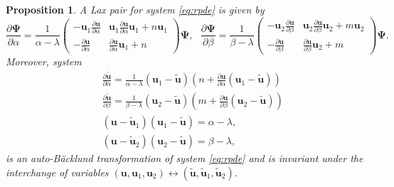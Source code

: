 \documentclass[dvips,10pt]{article}
\newcommand{\bs}{\boldsymbol}
\newcommand{\bsu}{ {\bs{u}}}
\newtheorem{proposition}{Proposition}
\theoremstyle{remark} %
\begin{document}
	\begin{proposition}
		A Lax pair for system \eqref{eq:rpde} is given by
		\begin{equation} \label{eq:Lax-rpde}
			\frac{\partial {\bs{\Psi}}}{\partial \alpha} = \frac{1}{\alpha-\lambda} \begin{pmatrix}
				-\bsu_1 \frac{\partial {\bs{u}}}{\partial \alpha} &  \bsu_1 \frac{\partial {\bs{u}}}{\partial \alpha} \bsu_1 + n \bsu_1 \\
				-\frac{\partial {\bs{u}}}{\partial \alpha} &  \frac{\partial {\bs{u}}}{\partial \alpha} \bsu_1 + n
			\end{pmatrix} {\bs{\Psi}}, ~~~ \frac{\partial {\bs{\Psi}}}{\partial \beta} = \frac{1}{\beta-\lambda} \begin{pmatrix}
				-\bsu_2 \frac{\partial {\bs{u}}}{\partial \beta} &  \bsu_2 \frac{\partial {\bs{u}}}{\partial \beta} \bsu_2 + m \bsu_2 \\
				-\frac{\partial {\bs{u}}}{\partial \beta} &  \frac{\partial {\bs{u}}}{\partial \beta} \bsu_2 + m
			\end{pmatrix} {\bs{\Psi}}.
		\end{equation}
		Moreover, system
		\begin{subequations} \label{eq:BT-rpde}
			\begin{eqnarray}
				&& \frac{\partial \tilde{\bsu}}{\partial \alpha} = \frac{1}{\alpha - \lambda} ({\bsu}_1- \tilde{\bsu}) \left(n + \frac{\partial \bsu}{\partial \alpha} ({\bsu}_1- \tilde{\bsu})\right)	\label{eq:BT-rpde-1} \\
				&& \frac{\partial \tilde{\bsu}}{\partial \beta} = \frac{1}{\beta - \lambda} ({\bsu}_2- \tilde{\bsu}) \left(m + \frac{\partial \bsu}{\partial \beta} ({\bsu}_2- \tilde{\bsu})\right)	\label{eq:BT-rpde-2} \\
				&& \left({\bs{u}} - \tilde{\bs{u}}_{1}\right) \left( {\bs{u}}_{1}-\tilde{\bs{u}}\right) = \alpha - \lambda,  \label{eq:BT-rpde-3} \\
				&& 	\left({\bs{u}} - \tilde{\bs{u}}_{2}\right) \left( {\bs{u}}_{2}-\tilde{\bs{u}}\right) = \beta - \lambda, 	\label{eq:BT-rpde-4}
			\end{eqnarray}
		\end{subequations}
		is an auto-B\"acklund transformation of system \eqref{eq:rpde} and is invariant under the interchange of variables $ (\bsu,\bsu_1,\bsu_2)  \leftrightarrow (\tilde{\bsu},\tilde{\bsu}_1,\tilde{\bsu}_2)$.
	\end{proposition}
	
\end{document}
